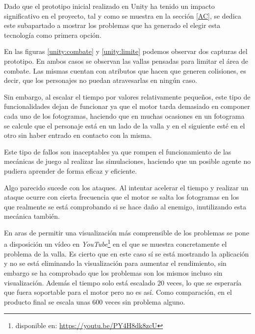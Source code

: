 Dado que el prototipo inicial realizado en Unity ha tenido un impacto significativo en el proyecto, tal y como se muestra en la sección \ref{AC}, se dedica este subapartado a mostrar los problemas que ha generado el elegir esta tecnología como primera opción.

\bigskip

En las figuras \ref{unity:combate} y \ref{unity:limite} podemos observar dos capturas del prototipo. En ambos casos se observan las vallas pensadas para limitar el área de combate. Las mismas cuentan con atributos que hacen que generen colisiones, es decir, que los personajes no puedan atravesarlas en ningún caso.

\bigskip

Sin embargo, al escalar el tiempo por valores relativamente pequeños, este tipo de funcionalidades dejan de funcionar ya que el motor tarda demasiado en componer cada uno de los fotogramas, haciendo que en muchas ocasiones en un fotograma se calcule que el personaje está en un lado de la valla y en el siguiente esté en el otro sin haber entrado en contacto con la misma.

\bigskip

Este tipo de fallos son inaceptables ya que rompen el funcionamiento de las mecánicas de juego al realizar las simulaciones, haciendo que un posible agente no pudiera aprender de forma eficaz y eficiente.

\bigskip

Algo parecido sucede con los ataques. Al intentar acelerar el tiempo y realizar un ataque ocurre con cierta frecuencia que el motor se salta los fotogramas en los que realmente se está comprobando si se hace daño al enemigo, inutilizando esta mecánica también.

\bigskip

En aras de permitir una visualización más comprensible de los problemas se pone a disposición un vídeo en \textit{YouTube}\footnote{disponible en: \url{https://youtu.be/PY4H8dk8zcU}} en el que se muestra concretamente el problema de la valla. Es cierto que en este caso sí se está mostrando la aplicación y no se está eliminando la visualización para aumentar el rendimiento, sin embargo se ha comprobado que los problemas son los mismos incluso sin visualización. Además el tiempo solo está escalado 20 veces, lo que se esperaría que fuera soportable para el motor pero no es así. Como comparación, en el producto final se escala unas 600 veces sin problema alguno.

